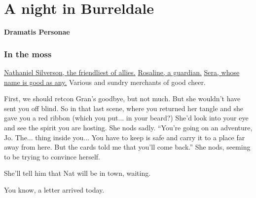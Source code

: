 \section{A night in Burreldale}

\textbf{\LARGE Dramatis Personae}
\subsubsection*{In the moss}
\hyperref[npc:nat]{Nathaniel Silverson, the friendliest of allies.} \newline
\hyperref[npc:rosaline]{Rosaline, a guardian.} \newline
\hyperref[npc:sera]{Sera, whose name is good as any.} \newline
Various and sundry merchants of good cheer. \newline



\begin{aloud}
	First, we should retcon Gran's goodbye, but not much.
	But she wouldn't have sent you off blind.
	So in that last scene, where you returned her tangle and she gave you a red ribbon (which you put... in your beard?)
	She'd look into your eye and see the spirit you are hosting.
	She nods sadly.
	``You're going on an adventure, Jo.
	The... thing inside you...
	You have to keep is safe and carry it to a place far away from here.
	But the cards told me that you'll come back.''
	She nods, seeming to be trying to convince herself.
	
	She'll tell him that Nat will be in town, waiting.
\end{aloud}

\begin{aloud}
    You know, a letter arrived today.
\end{aloud}


